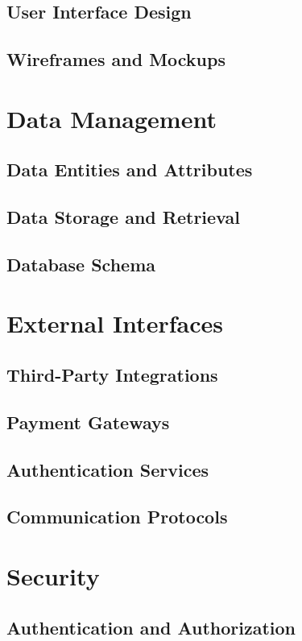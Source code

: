 \documentclass{article}
\begin{document}
   \subsection{User Interface Design}
   \subsection{Wireframes and Mockups}

\section{Data Management}
   \subsection{Data Entities and Attributes}
   \subsection{Data Storage and Retrieval}
   \subsection{Database Schema}

\section{External Interfaces}
   \subsection{Third-Party Integrations}
   \subsection{Payment Gateways}
   \subsection{Authentication Services}
   \subsection{Communication Protocols}

\section{Security}
   \subsection{Authentication and Authorization}
\end{document}
